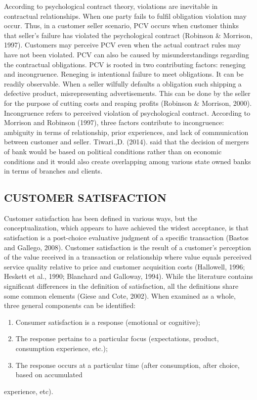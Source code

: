 \documentclass[a4paper, 12pt]{extarticle}
\begin{document}
{\par According to psychological contract theory, violations are inevitable in contractual relationships. When one party fails to fulfil obligation violation may occur. Thus, in a customer seller scenario, PCV occurs when customer thinks that seller's failure has violated the psychological contract (Robinson \& Morrison, 1997). Customers may perceive PCV even when the actual contract rules may have not been violated. PCV can also be caused by misunderstandings regarding the contractual obligations. PCV is rooted in two contributing factors: reneging and incongruence. Reneging is intentional failure to meet obligations. It can be readily observable.  When a seller wilfully defaults a obligation such shipping a defective product, misrepresenting advertisements. This can be done by the seller for the purpose of cutting costs and reaping profits (Robinson \& Morrison, 2000).
Incongruence refers to perceived violation of psychological contract. According to Morrison and Robinson (1997), three factors contribute to incongruence: ambiguity in terms of relationship, prior experiences, and lack of communication between customer and seller. Tiwari.,D. (2014). said that the decision of mergers of bank would be based on political conditions rather than on economic conditions and it would also create overlapping among various state owned banks in terms of branches and clients.
\subsection{CUSTOMER SATISFACTION}
\par Customer satisfaction has been defined in various ways, but the conceptualization, which appears to have achieved the widest acceptance, is that satisfaction is a post-choice evaluative judgment of a specific transaction (Bastos and Gallego, 2008). Customer satisfaction is the result of a customer's perception of the value received in a transaction or relationship where value equals perceived service quality relative to price and customer acquisition costs (Hallowell, 1996; Heskett et al., 1990; Blanchard and Galloway, 1994). While the literature contains significant differences in the definition of satisfaction, all the definitions share some common elements (Giese and Cote, 2002). When examined as a whole, three general components can be identified:
\begin{enumerate}
\item Consumer satisfaction is a response (emotional or cognitive);
\item The response pertains to a particular focus (expectations, product, consumption experience, etc.);
\item The response occurs at a particular time (after consumption, after choice, based on accumulated
\end{enumerate}
experience, etc).
}
\end{document}
